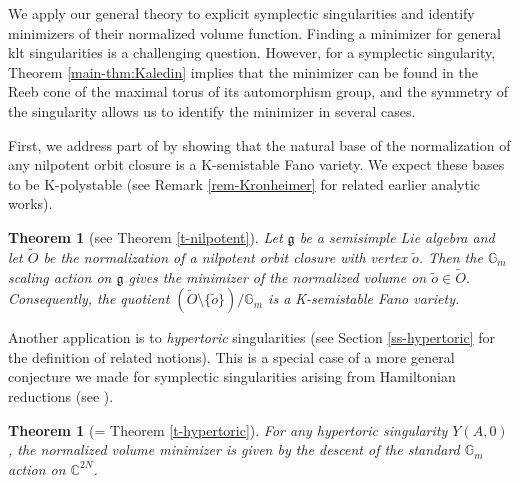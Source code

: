 \documentclass[12pt]{amsart}
\newtheorem{thm}[prop]{Theorem}
\theoremstyle{definition}
\newcommand{\bG}{\mathbb{G}}
\newcommand{\fg}{\mathfrak g}
\numberwithin{equation}{section}
\begin{document}
\medskip

We apply our general theory to explicit symplectic singularities and identify minimizers of their normalized volume function. Finding a minimizer for general klt singularities is a challenging question. However, for a symplectic singularity, Theorem \ref{main-thm:Kaledin} implies that the minimizer can be found in the Reeb cone of the maximal torus of its automorphism group, and the symmetry of the singularity allows us to identify the minimizer in several cases. 

First, we address part of \cite[Problem 23]{XZ-open} by showing that the natural base of the normalization of any nilpotent orbit closure is a K-semistable Fano variety. %
We expect these bases to be K-polystable (see Remark \ref{rem-Kronheimer} for related earlier analytic works). %
 

\begin{thm}[see Theorem \ref{t-nilpotent}] \label{main thm:nilpotent}
Let $\fg$ be a semisimple Lie algebra and let $\widetilde{O}$ be the normalization of a nilpotent orbit closure with vertex $\tilde{o}$. Then the $\bG_m$ scaling action on $\fg$ gives the minimizer of the normalized volume on $\tilde{o}\in \widetilde{O}$. Consequently, the quotient $\left(\widetilde{O} \setminus \{\tilde{o}\}\right)/\bG_m$ is a K-semistable Fano variety. 
\end{thm}

Another application is to \emph{hypertoric} singularities (see Section \ref{ss-hypertoric} for the definition of related notions). This is a special case of a more general conjecture we made for symplectic singularities arising from Hamiltonian reductions (see \cite[Problem 27]{XZ-open}).

\begin{thm}[= Theorem \ref{t-hypertoric}] \label{main thm:hypertoric}
For any hypertoric singularity $Y(A,0)$, the normalized volume minimizer is given by the descent of the standard $\bG_m$ action on $\mathbb C^{2N}$.
\end{thm}
\end{document}
